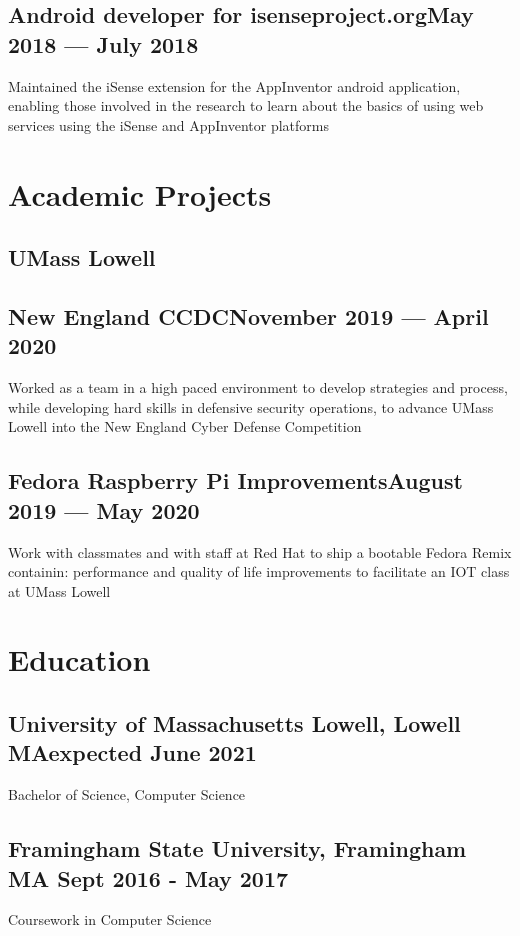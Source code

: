\documentclass[11pt]{article}
\begin{document}
\subsection{Android developer for isenseproject.org\dotfill May 2018 --- July 2018}
Maintained the iSense
extension for the AppInventor android application, 
enabling those involved in the research to learn
about the basics of using web services using the iSense
and AppInventor platforms

\section{Academic Projects}

\subsection{UMass Lowell}
\subsection{New England CCDC\dotfill November 2019 --- April 2020 }

Worked as a team in a high paced environment to develop
strategies and process, while
developing hard skills in defensive security operations,
to advance UMass Lowell into the New England Cyber Defense
Competition

\subsection{Fedora Raspberry Pi Improvements\dotfill August 2019 --- May 2020 }

Work with classmates
and with staff at Red Hat
to ship a bootable Fedora Remix containin: performance and quality of life improvements
to facilitate an IOT class at UMass Lowell

\section{Education}

\subsection{University of Massachusetts Lowell, Lowell MA\dotfill expected June 2021}
{\hspace{-1em} Bachelor of Science, Computer Science}

\subsection{Framingham State University, Framingham MA
\dotfill Sept 2016 - May 2017} 
{\hspace{-1em}Coursework in Computer Science}
\end{document}
